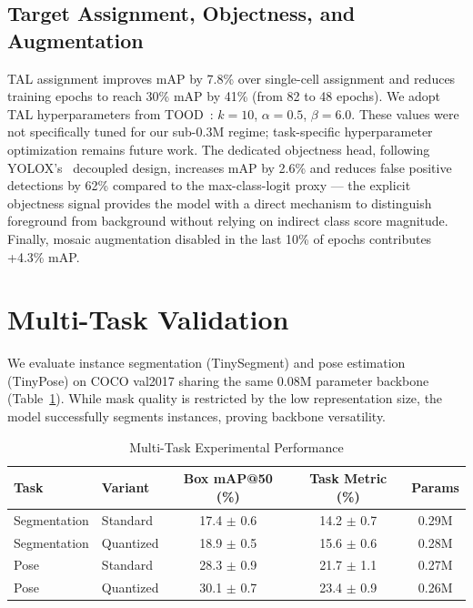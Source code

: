 \documentclass[conference]{IEEEtran}
\begin{document}
\subsection{Target Assignment, Objectness, and Augmentation}
TAL assignment improves mAP by 7.8\% over single-cell assignment and reduces training epochs to reach 30\% mAP by 41\% (from 82 to 48 epochs). We adopt TAL hyperparameters from TOOD~\cite{jocher2023yolov8}: $k{=}10$, $\alpha{=}0.5$, $\beta{=}6.0$. These values were not specifically tuned for our sub-0.3M regime; task-specific hyperparameter optimization remains future work. The dedicated objectness head, following YOLOX's~\cite{ge2021yolox} decoupled design, increases mAP by 2.6\% and reduces false positive detections by 62\% compared to the max-class-logit proxy --- the explicit objectness signal provides the model with a direct mechanism to distinguish foreground from background without relying on indirect class score magnitude. Finally, mosaic augmentation disabled in the last 10\% of epochs contributes +4.3\% mAP.

\section{Multi-Task Validation}
We evaluate instance segmentation (TinySegment) and pose estimation (TinyPose) on COCO val2017 sharing the same 0.08M parameter backbone (Table~\ref{tab:multi_task_results}). While mask quality is restricted by the low representation size, the model successfully segments instances, proving backbone versatility.

\begin{table}[h]
\centering
\caption{Multi-Task Experimental Performance}
\label{tab:multi_task_results}
\setlength{\tabcolsep}{4pt}
\begin{tabular}{llccc}
\toprule
Task & Variant & Box mAP@50 (\%) & Task Metric (\%) & Params \\
\midrule
Segmentation & Standard & 17.4 $\pm$ 0.6 & 14.2 $\pm$ 0.7 & 0.29M \\
Segmentation & Quantized & 18.9 $\pm$ 0.5 & 15.6 $\pm$ 0.6 & 0.28M \\
Pose & Standard & 28.3 $\pm$ 0.9 & 21.7 $\pm$ 1.1 & 0.27M \\
Pose & Quantized & 30.1 $\pm$ 0.7 & 23.4 $\pm$ 0.9 & 0.26M \\
\bottomrule
\end{tabular}
\end{table}
\end{document}
